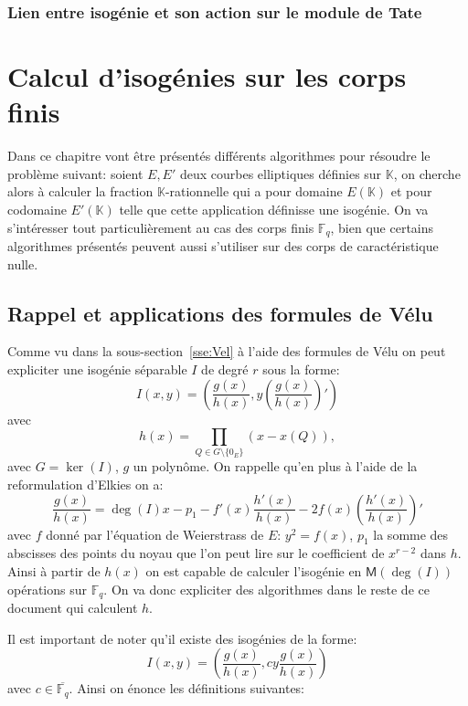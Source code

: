 \documentclass[10pt,a4paper]{book}
\theoremstyle{plain}
\theoremstyle{definition}
\theoremstyle{definition}
\theoremstyle{definition}
\theoremstyle{definition}
\theoremstyle{remark}
\theoremstyle{remark}
\theoremstyle{definition}
\begin{document}
\subsection{Lien entre isogénie et son action sur le module de Tate}

\chapter{Calcul d'isogénies sur les corps finis}
\label{cha:iso:computing}
Dans ce chapitre vont être présentés différents algorithmes pour résoudre le problème suivant: soient $E, E'$ deux courbes elliptiques définies sur $\mathbb{K}$, on cherche alors à calculer la fraction $\mathbb{K}$-rationnelle qui a pour domaine $E(\mathbb{K})$ et pour codomaine $E'(\mathbb{K})$  telle que  cette application  définisse une isogénie.
On va s'intéresser tout particulièrement au cas des corps finis $\mathbb{F}_q$, bien que certains algorithmes présentés peuvent aussi s'utiliser sur des corps de caractéristique nulle.

\section{Rappel et applications des formules de Vélu}
Comme vu dans la sous-section~\ref{sse:Vel} à l'aide des formules de Vélu on peut expliciter une isogénie séparable $I$ de degré $r$ sous la forme:
\begin{equation} 
I(x,y)=\left(\frac{g(x)}{h(x)},y\left( \frac{g(x)}{h(x)} \right)'\right)
\end{equation}
avec 
\begin{equation*}
h(x)=\prod_{Q \in G \setminus \{0_E\}}(x-x(Q)),
\end{equation*}
avec $G=\ker(I)$, $g$ un polynôme. On rappelle qu'en plus à l'aide de la reformulation d'Elkies on a:
\begin{equation}
\label{eq:vel:elk}
\frac{g(x)}{h(x)}= \deg(I) x -p_1 - f'(x) \frac{h'(x)}{h(x)} -2f(x)  \left(\frac{h'(x)}{h(x)}\right)'
\end{equation}
avec $f$ donné par l'équation de Weierstrass de $E$: $y^2=f(x)$, $p_1$ la somme des abscisses des points du noyau que l'on peut lire sur le coefficient de $x^{r-2}$ dans $h$. Ainsi à partir de $h(x)$ on est capable de calculer l'isogénie en $\mathsf{M}(\deg(I))$ opérations sur $\mathbb{F}_q$. On va donc expliciter des algorithmes dans le reste de ce document qui calculent $h$.


Il est important de noter qu'il existe des isogénies de la forme:
\begin{equation}
\label{eq:iso:gen}
I(x,y)=\left( \frac{g(x)}{h(x)},cy\frac{g(x)}{h(x)} \right)
\end{equation}
avec $c \in \overline{\mathbb{F}_q}$. Ainsi on énonce les définitions suivantes:
\end{document}
